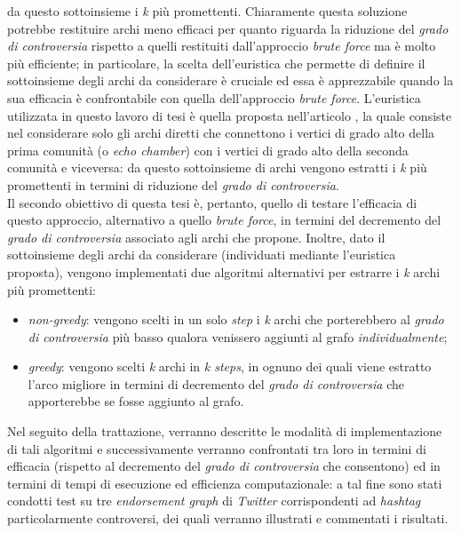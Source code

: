 \documentclass[trieste]{toptesi}
\begin{document}
da questo sottoinsieme i \textit{k} più promettenti. Chiaramente questa soluzione potrebbe restituire archi meno efficaci per quanto riguarda la riduzione del \textit{grado di controversia} rispetto a quelli restituiti dall'approccio \textit{brute force} ma è molto più efficiente; in particolare, la scelta dell'euristica che permette di definire il sottoinsieme degli archi da considerare è cruciale ed essa è apprezzabile quando la sua efficacia è confrontabile con quella dell'approccio \textit{brute force}. L'euristica utilizzata in questo lavoro di tesi è quella proposta nell'articolo \cite{famous:paper}, la quale
consiste nel considerare solo gli archi diretti che connettono i vertici di grado alto della prima comunità (o \textit{echo chamber}) con i vertici di grado alto della seconda comunità e viceversa: da questo sottoinsieme di archi vengono estratti i \textit{k} più promettenti in termini di riduzione del \textit{grado di controversia}. \\Il secondo obiettivo di questa tesi è, pertanto, quello di testare l'efficacia di questo approccio, alternativo a quello \textit{brute force}, in termini del decremento del \textit{grado di controversia} associato agli archi che propone. Inoltre, dato il sottoinsieme degli archi da considerare (individuati mediante l'euristica proposta), vengono implementati due algoritmi alternativi per estrarre i \textit{k} archi più promettenti: 
\begin{itemize}
\item \textit{non-greedy}: vengono scelti in un solo \textit{step} i \textit{k} archi che porterebbero al \textit{grado di controversia} più basso qualora venissero aggiunti al grafo \textit{individualmente};
\item \textit{greedy}: vengono scelti \textit{k} archi in \textit{k steps}, in ognuno dei quali viene estratto l'arco migliore in termini di decremento del \textit{grado di controversia} che apporterebbe se fosse aggiunto al grafo.
\end{itemize}
Nel seguito della trattazione, verranno descritte le modalità di implementazione di tali algoritmi e successivamente verranno confrontati tra loro in termini di efficacia (rispetto al decremento del \textit{grado di controversia} che consentono) ed in termini di tempi di esecuzione ed efficienza computazionale: a tal fine sono stati condotti test su tre \textit{endorsement graph} di \textit{Twitter} corrispondenti ad \textit{hashtag} particolarmente controversi, dei quali verranno illustrati e commentati i risultati.
\end{document}
